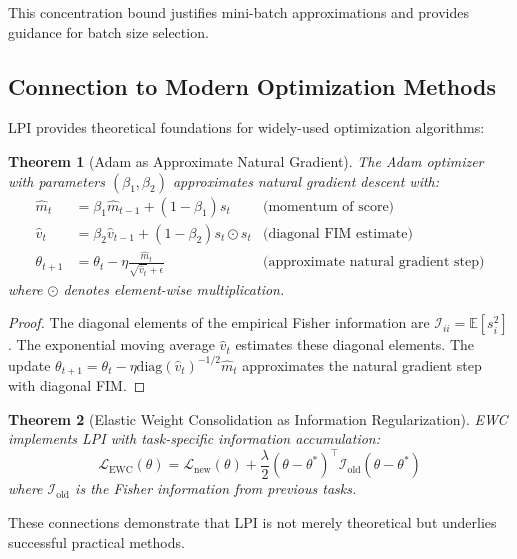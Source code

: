 \documentclass[11pt]{article}
\newtheorem{theorem}{Theorem}
\begin{document}
This concentration bound justifies mini-batch approximations and provides guidance for batch size selection.

\subsection{Connection to Modern Optimization Methods}

LPI provides theoretical foundations for widely-used optimization algorithms:

\begin{theorem}[Adam as Approximate Natural Gradient]
\label{thm:adam_natural}
The Adam optimizer \cite{kingma2014adam} with parameters $(\beta_1, \beta_2)$ approximates natural gradient descent with:
\begin{align}
\hat{m}_t &= \beta_1 \hat{m}_{t-1} + (1-\beta_1) s_t & \text{(momentum of score)}\\
\hat{v}_t &= \beta_2 \hat{v}_{t-1} + (1-\beta_2) s_t \odot s_t & \text{(diagonal FIM estimate)}\\
\theta_{t+1} &= \theta_t - \eta \frac{\hat{m}_t}{\sqrt{\hat{v}_t} + \epsilon} & \text{(approximate natural gradient step)}
\end{align}
where $\odot$ denotes element-wise multiplication.
\end{theorem}

\begin{proof}
The diagonal elements of the empirical Fisher information are $\mathcal{I}_{ii} = \mathbb{E}[s_i^2]$. The exponential moving average $\hat{v}_t$ estimates these diagonal elements. The update $\theta_{t+1} = \theta_t - \eta \text{diag}(\hat{v}_t)^{-1/2} \hat{m}_t$ approximates the natural gradient step with diagonal FIM.
\end{proof}

\begin{theorem}[Elastic Weight Consolidation as Information Regularization]
EWC \cite{kirkpatrick2017overcoming} implements LPI with task-specific information accumulation:
\begin{equation}
\mathcal{L}_{\text{EWC}}(\theta) = \mathcal{L}_{\text{new}}(\theta) + \frac{\lambda}{2}(\theta - \theta^*)^\top \mathcal{I}_{\text{old}} (\theta - \theta^*)
\end{equation}
where $\mathcal{I}_{\text{old}}$ is the Fisher information from previous tasks.
\end{theorem}

These connections demonstrate that LPI is not merely theoretical but underlies successful practical methods.
\end{document}
